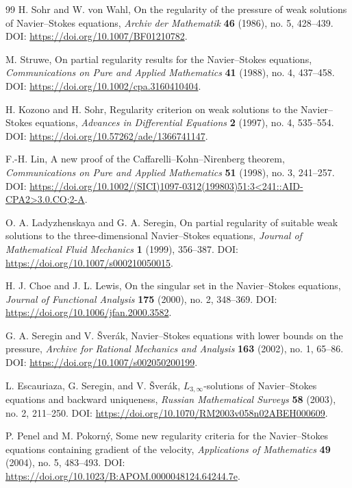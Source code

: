 \documentclass[pdflatex,sn-mathphys-num]{sn-jnl}
\numberwithin{equation}{section}
\theoremstyle{thmstyleone}
\theoremstyle{thmstylethree}
\begin{document}
\begin{thebibliography}{99}
	H. Sohr and W. von Wahl,
	On the regularity of the pressure of weak solutions of Navier--Stokes equations,
	\emph{Archiv der Mathematik} \textbf{46} (1986), no. 5, 428--439.
	\newblock DOI: \url{https://doi.org/10.1007/BF01210782}.
	
	M. Struwe,
	On partial regularity results for the Navier--Stokes equations,
	\emph{Communications on Pure and Applied Mathematics} \textbf{41} (1988), no. 4, 437--458.
	\newblock DOI: \url{https://doi.org/10.1002/cpa.3160410404}.
	
	H. Kozono and H. Sohr,
	Regularity criterion on weak solutions to the Navier--Stokes equations,
	\emph{Advances in Differential Equations} \textbf{2} (1997), no. 4, 535--554.
	\newblock DOI: \url{https://doi.org/10.57262/ade/1366741147}.
	
	F.-H. Lin,
	A new proof of the Caffarelli--Kohn--Nirenberg theorem,
	\emph{Communications on Pure and Applied Mathematics} \textbf{51} (1998), no. 3, 241--257.
	\newblock DOI: \url{https://doi.org/10.1002/(SICI)1097-0312(199803)51:3<241::AID-CPA2>3.0.CO;2-A}.
	
	O. A. Ladyzhenskaya and G. A. Seregin,
	On partial regularity of suitable weak solutions to the three-dimensional Navier--Stokes equations,
	\emph{Journal of Mathematical Fluid Mechanics} \textbf{1} (1999), 356--387.
	\newblock DOI: \url{https://doi.org/10.1007/s000210050015}.
	
	
	H. J. Choe and J. L. Lewis,
	On the singular set in the Navier--Stokes equations,
	\emph{Journal of Functional Analysis} \textbf{175} (2000), no. 2, 348--369.
	\newblock DOI: \url{https://doi.org/10.1006/jfan.2000.3582}.
	
	G. A. Seregin and V. \v{S}ver\'ak,
	Navier--Stokes equations with lower bounds on the pressure,
	\emph{Archive for Rational Mechanics and Analysis} \textbf{163} (2002), no. 1, 65--86.
	\newblock DOI: \url{https://doi.org/10.1007/s002050200199}.
	
	L. Escauriaza, G. Seregin, and V. \v{S}ver\'ak,
	\(L_{3,\infty}\)-solutions of Navier--Stokes equations and backward uniqueness,
	\emph{Russian Mathematical Surveys} \textbf{58} (2003), no. 2, 211--250.
	\newblock DOI: \url{https://doi.org/10.1070/RM2003v058n02ABEH000609}.
	
	P. Penel and M. Pokorn\'y,
	Some new regularity criteria for the Navier--Stokes equations containing gradient of the velocity,
	\emph{Applications of Mathematics} \textbf{49} (2004), no. 5, 483--493.
	\newblock DOI: \url{https://doi.org/10.1023/B:APOM.0000048124.64244.7e}.
	

\end{thebibliography}
\end{document}
